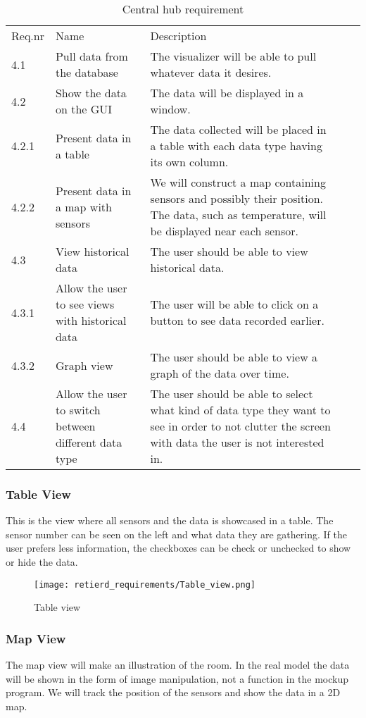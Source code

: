 \documentclass[../document]{subfiles}
\begin{document}
\begin{table}[H]
\caption{Central hub requirement}
\centering
\begin{tabularx}{\textwidth}{|l|X|X|l|X|}
\hline
\\ \hline Req.nr
&Name
&Description
\\ \hline 4.1
&Pull data from the database
&The visualizer will be able to pull whatever data it desires.
\\ \hline 4.2
&Show the data on the GUI
&The data will be displayed in a window.
\\ \hline 4.2.1
&Present data in a table
&The data collected will be placed in a table with each data type having its own column.
\\ \hline 4.2.2
&Present data in a map with sensors
&We will construct a map containing sensors and possibly their position. The data, such as temperature, will be displayed near each sensor.
\\ \hline 4.3
&View historical data
&The user should be able to view historical data.
\\ \hline 4.3.1
&Allow the user to see views with historical data
&The user will be able to click on a button to see data recorded earlier.
\\ \hline 4.3.2
&Graph view
&The user should be able to view a graph of the data over time.
\\ \hline 4.4
&Allow the user to switch between different data type
&The user should be able to select what kind of data type they want to see in order to not clutter the screen with data the user is not interested in.
\\ \hline 
\end{tabularx}
\end{table}

\subsubsection{Table View}
This is the view where all sensors and the data is showcased in a table. The sensor number can be seen on the left and what data they are gathering. If the user prefers less information, the checkboxes can be check or unchecked to show or hide the data.

\begin{figure}[H]
	\centering
	\texttt{[image: retierd\_requirements/Table\_view.png]}
	\caption{Table view}
\end{figure}

\subsubsection{Map View}
The map view will make an illustration of the room. In the real model the data will be shown in the form of image manipulation, not a function in the mockup program. We will track the position of the sensors and show the data in a 2D map.
\end{document}

